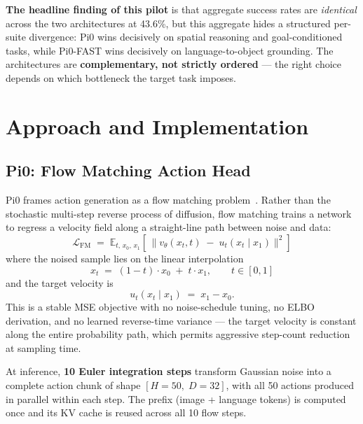 \documentclass[11pt,letterpaper]{article}
\begin{document}
\textbf{The headline finding of this pilot} is that aggregate success rates are \emph{identical} across the two architectures at 43.6\%, but this aggregate hides a structured per-suite divergence: Pi0 wins decisively on spatial reasoning and goal-conditioned tasks, while Pi0-FAST wins decisively on language-to-object grounding. The architectures are \textbf{complementary, not strictly ordered} --- the right choice depends on which bottleneck the target task imposes.

\section{Approach and Implementation}

\subsection{Pi0: Flow Matching Action Head}

Pi0 frames action generation as a flow matching problem~\cite{lipman2023flow}. Rather than the stochastic multi-step reverse process of diffusion, flow matching trains a network to regress a velocity field along a straight-line path between noise and data:
\begin{equation}
  \mathcal{L}_{\text{FM}} \;=\; \mathbb{E}_{t,\,x_0,\,x_1}\!\left[\,\bigl\lVert v_\theta(x_t, t) \;-\; u_t(x_t \mid x_1) \bigr\rVert^{2}\right]
  \label{eq:fm-loss}
\end{equation}
where the noised sample lies on the linear interpolation
\begin{equation}
  x_t \;=\; (1-t)\cdot x_0 \;+\; t\cdot x_1, \qquad t\in[0,1]
\end{equation}
and the target velocity is
\begin{equation}
  u_t(x_t \mid x_1) \;=\; x_1 - x_0.
\end{equation}
This is a stable MSE objective with no noise-schedule tuning, no ELBO derivation, and no learned reverse-time variance --- the target velocity is constant along the entire probability path, which permits aggressive step-count reduction at sampling time.

At inference, \textbf{10 Euler integration steps} transform Gaussian noise into a complete action chunk of shape $[H{=}50,\;D{=}32]$, with all 50 actions produced in parallel within each step. The prefix (image + language tokens) is computed once and its KV cache is reused across all 10 flow steps.
\end{document}
